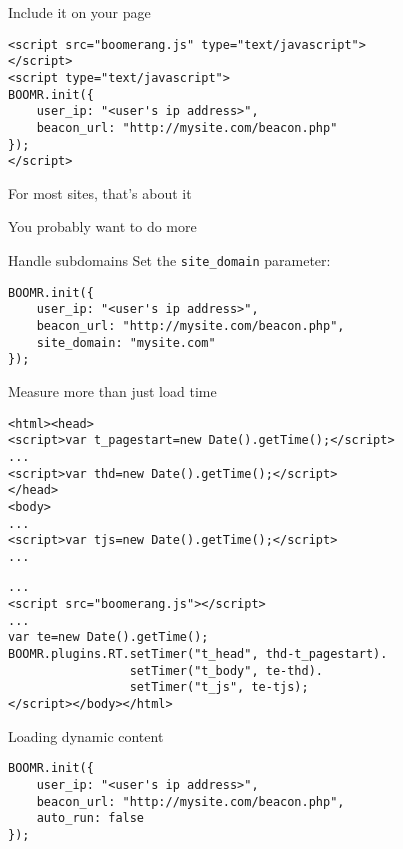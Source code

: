 \documentclass{beamer}
\begin{document}
\begin{frame}[fragile]{Include it on your page}
  \begin{verbatim}
<script src="boomerang.js" type="text/javascript">
</script>
<script type="text/javascript">
BOOMR.init({
    user_ip: "<user's ip address>",
    beacon_url: "http://mysite.com/beacon.php"
});
</script>
  \end{verbatim}
\end{frame}

\begin{frame}{}
  \begin{center}
  For most sites, that's about it
  \end{center}
\end{frame}

\begin{frame}{}
  \begin{center}
  You probably want to do more
  \end{center}
\end{frame}

\begin{frame}[fragile]{Handle subdomains}
Set the \texttt{site\_domain} parameter:
\begin{verbatim}
BOOMR.init({
    user_ip: "<user's ip address>",
    beacon_url: "http://mysite.com/beacon.php",
    site_domain: "mysite.com"
});
\end{verbatim}
\end{frame}

\begin{frame}[fragile]{Measure more than just load time}
\begin{verbatim}
<html><head>
<script>var t_pagestart=new Date().getTime();</script>
...
<script>var thd=new Date().getTime();</script>
</head>
<body>
...
<script>var tjs=new Date().getTime();</script>
...
\end{verbatim}
\end{frame}

\begin{frame}[fragile]{}
\begin{verbatim}
...
<script src="boomerang.js"></script>
...
var te=new Date().getTime();
BOOMR.plugins.RT.setTimer("t_head", thd-t_pagestart).
                 setTimer("t_body", te-thd).
                 setTimer("t_js", te-tjs);
</script></body></html>
\end{verbatim}
\end{frame}

\begin{frame}[fragile]{Loading dynamic content}
\begin{verbatim}
BOOMR.init({
    user_ip: "<user's ip address>",
    beacon_url: "http://mysite.com/beacon.php",
    auto_run: false
});
\end{verbatim}
\end{frame}
\end{document}

